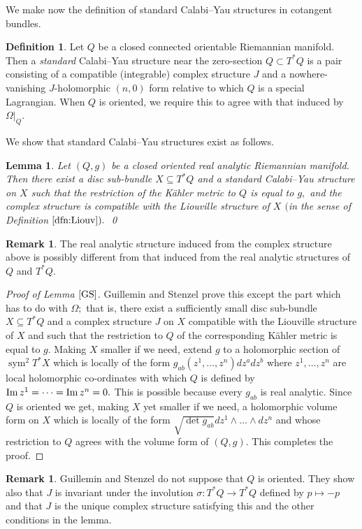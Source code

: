 \documentclass{article}
\DeclareMathOperator{\sym}{sym}
\theoremstyle{plain}%
\newtheorem{lem}[thm]{Lemma}
\theoremstyle{definition}
\newtheorem{dfn}[thm]{Definition}
\newtheorem{rem}[thm]{Remark}
\numberwithin{equation}{section}
\numberwithin{figure}{section}
\def\l{\label}
\def\Im{\mathop{\rm Im}}
\def\si{\sigma}
\def\Om{\Omega}
\def\sb{\subseteq}
\begin{document}
We make now the definition of standard Calabi--Yau structures in cotangent bundles.
\begin{dfn} \label{dfn: standard CY}
Let $Q$ be a closed connected orientable Riemannian manifold. Then a {\it standard} Calabi--Yau structure near the zero-section $Q\subset T^*Q$ is a pair consisting of a compatible (integrable) complex structure $J$ and a nowhere-vanishing $J$-holomorphic $(n,0)$ form relative to which $Q$ is a special Lagrangian. When $Q$ is oriented, we require this to agree with that induced by $\Om|_Q.$
\end{dfn}
We show that standard Calabi--Yau structures exist as follows.
\begin{lem}\l{GS}
Let $(Q,g)$ be a closed oriented real analytic Riemannian manifold.
Then there exist a disc sub-bundle $X\sb T^*Q$ and a standard Calabi--Yau structure on $X$ such that the restriction of the K\"ahler metric to $Q$ is equal to $g,$ and the complex structure is compatible with the Liouville structure of $X$ $($in the sense of Definition $\ref{dfn:Liouv}).$
\qed
\end{lem}
\begin{rem}
The real analytic structure induced from the complex structure above is possibly different from that induced from the real analytic structures of $Q$ and $T^*Q.$
\end{rem}
\begin{proof}[Proof of Lemma $\ref{GS}$]
Guillemin and Stenzel \cite[\S5]{GS} prove this except the part which has to do with $\Om;$ that is, there exist a sufficiently small disc sub-bundle $X\sb T^*Q$ and a complex structure $J$ on $X$ compatible with the Liouville structure of $X$ and such that the restriction to $Q$ of the corresponding K\"ahler metric is equal to $g.$
Making $X$ smaller if we need, extend $g$ to a holomorphic section of $\sym^2T^*X$ which is locally of the form $g_{ab}(z^1,\dots,z^n)dz^adz^b$ where $z^1,\dots,z^n$ are local holomorphic co-ordinates with which $Q$ is defined by $\Im z^1=\dots=\Im z^n=0.$ This is possible because every $g_{ab}$ is real analytic.
Since $Q$ is oriented we get, making $X$ yet smaller if we need, a holomorphic volume form on $X$ which is locally of the form $\sqrt{\det g_{ab}}dz^1\wedge\dots\wedge dz^n$ and whose restriction to $Q$ agrees with the volume form of $(Q,g).$ This completes the proof.
\end{proof}
\begin{rem}
Guillemin and Stenzel \cite[\S5]{GS} do not suppose that $Q$ is oriented.
They show also that $J$ is invariant under the involution $\si:T^*Q\to T^*Q$ defined by $p\mapsto -p$ and that $J$ is the unique complex structure satisfying this and the other conditions in the lemma.
\end{rem}
\end{document}

